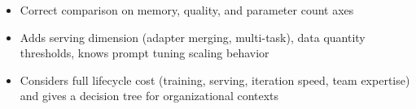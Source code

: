 \begin{interviewq}
\goodgreat
\begin{itemize}
    \item {} Correct comparison on memory, quality, and parameter count axes
    \item {} Adds serving dimension (adapter merging, multi-task), data quantity thresholds, knows prompt tuning scaling behavior
    \item {} Considers full lifecycle cost (training, serving, iteration speed, team expertise) and gives a decision tree for organizational contexts
\end{itemize}

\end{interviewq}